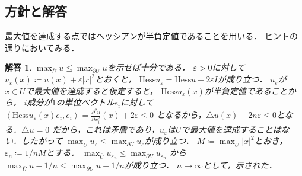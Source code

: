 \documentclass[dvipdfmx,autodetect-engine]{jsarticle}
\newtheorem*{ans}{解答}
\theoremstyle{remark}
\theoremstyle{definition}
\newcommand{\abs}[1]{\left\lvert#1\right\rvert}
\newcommand{\iprod}[1]{\left\langle #1 \right\rangle}
\begin{document}
\subsection{方針と解答}
最大値を達成する点ではヘッシアンが半負定値であることを用いる．
ヒントの通りにおいてみる．

\begin{ans}
    $\max_{\bar{U}} u \leq \max_{\partial U} u$を示せば十分である．
    $\varepsilon>0$に対して
    $u_{\varepsilon}(x) \coloneqq u(x) + \varepsilon \abs{x}^{2}$とおくと，
    $\mathrm{Hess} u_{\varepsilon} = \mathrm{Hess} u + 2\varepsilon I$が成り立つ．
    $u_{\varepsilon}$が$x \in U$で最大値を達成すると仮定すると，
    $\mathrm{Hess} u_{\varepsilon}(x)$が半負定値であることから，
    $i$成分が$1$の単位ベクトル$e_{i}$に対して
    $\iprod{\mathrm{Hess} u_{\varepsilon}(x) e_{i}, e_{i}} 
    = \frac{\partial^{2}u}{\partial x_{i}^{2}}(x) + 2\varepsilon \leq 0$
    となるから，$\triangle u (x) + 2n\varepsilon \leq 0$となる．$\triangle u=0$
    だから，これは矛盾であり，$u_{\varepsilon}$は$U$で最大値を達成することはない．したがって
    $\max_{\bar{U}} u_{\varepsilon} \leq \max_{\partial U} u_{\varepsilon}$が成り立つ．
    $M \coloneqq \max_{\bar{U}} \abs{x}^{2}$とおき，$\varepsilon_{n} 
    \coloneqq 1/nM$とする．
    $\max_{\bar{U}} u_{\varepsilon_{n}} \leq \max_{\partial U} u_{\varepsilon_{n}}$
    から
    $\max_{\bar{U}} u - 1/n \leq \max_{\partial U}u + 1/n$が成り立つ．
    $n \to \infty$として，示された．
\end{ans}
\end{document}
